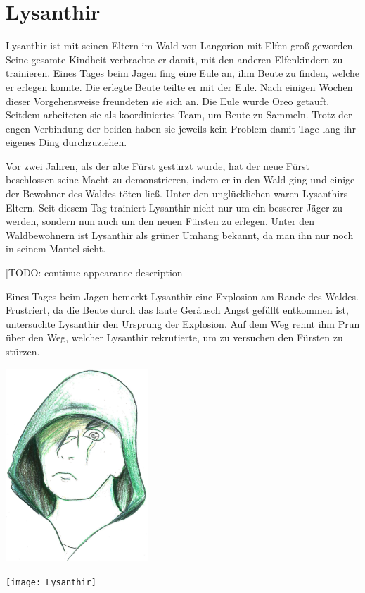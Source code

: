 \documentclass[10pt,twoside,twocolumn,openany]{book}
\begin{document}
	\newpage
	\section{Lysanthir}
	
	Lysanthir ist mit seinen Eltern im Wald von Langorion mit Elfen groß geworden. Seine gesamte Kindheit verbrachte er damit, mit den anderen Elfenkindern zu trainieren. Eines Tages beim Jagen fing eine Eule an, ihm Beute zu finden, welche er erlegen konnte. Die erlegte Beute teilte er mit der Eule. Nach einigen Wochen dieser Vorgehensweise freundeten sie sich an. Die Eule wurde Oreo getauft. Seitdem arbeiteten sie als koordiniertes Team, um Beute zu Sammeln. Trotz der engen Verbindung der beiden haben sie jeweils kein Problem damit Tage lang ihr eigenes Ding durchzuziehen. 
	
	Vor zwei Jahren, als der alte Fürst gestürzt wurde, hat der neue Fürst beschlossen seine Macht zu demonstrieren, indem er in den Wald ging und einige der Bewohner des Waldes töten ließ. Unter den unglücklichen waren Lysanthirs Eltern. Seit diesem Tag trainiert Lysanthir nicht nur um ein besserer Jäger zu werden, sondern nun auch um den neuen Fürsten zu erlegen. Unter den Waldbewohnern ist Lysanthir als grüner Umhang bekannt, da man ihn nur noch in seinem Mantel sieht. 
	
	[TODO: continue appearance description]

	Eines Tages beim Jagen bemerkt Lysanthir eine Explosion am Rande des Waldes. Frustriert, da die Beute durch das laute Geräusch Angst gefüllt entkommen ist, untersuchte Lysanthir den Ursprung der Explosion. Auf dem Weg rennt ihm Prun über den Weg, welcher Lysanthir rekrutierte, um zu versuchen den Fürsten zu stürzen.
	
	\includegraphics[width=0.40\textwidth]{LysanthirFace}\par
	\texttt{[image: Lysanthir]}\par\vspace{1cm}
	\newpage
	
\end{document}
